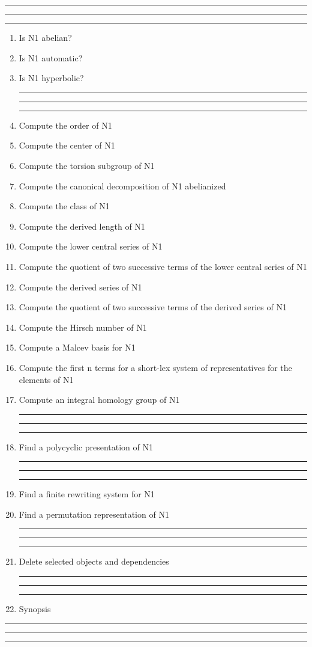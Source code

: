
\bigskip
\hrule\hrule\hrule

\begin{enumerate}

\item Is N1 abelian?

\item Is N1 automatic?

\item Is N1 hyperbolic?

\bigskip
\hrule\hrule\hrule

\item Compute the order of N1

\item Compute the center of N1

\item Compute the torsion subgroup of N1

\item Compute the canonical decomposition of N1 abelianized

\item Compute the class of N1

\item Compute the derived length of N1

\item Compute the lower central series of N1

\item Compute the quotient of two successive terms of the lower central
series of N1

\item Compute the derived series of N1

\item Compute the quotient of two successive terms of the derived series
of N1

\item Compute the Hirsch number of N1

\item Compute a Malcev basis for N1

\item Compute the first n terms for a short-lex system of representatives for the
elements of N1

\item Compute an integral homology group of N1

\bigskip
\hrule\hrule\hrule

\item Find a polycyclic presentation of N1

\bigskip
\hrule\hrule\hrule

\item Find a finite rewriting system for N1

\item Find a permutation representation of N1

\bigskip
\hrule\hrule\hrule

\item Delete selected objects and dependencies
\bigskip
\hrule\hrule\hrule
\item Synopsis
\end{enumerate}

\bigskip
\hrule\hrule\hrule
